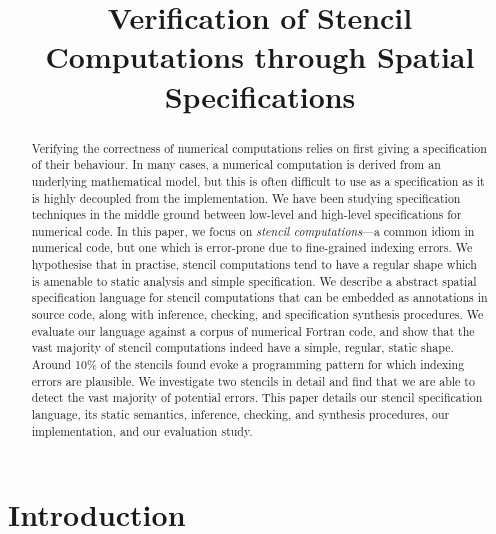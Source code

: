 \documentclass[9pt]{sigplanconf}
\title{Verification of Stencil Computations through Spatial
  Specifications}
\theoremstyle{definition}
\begin{document}
\maketitle

\begin{abstract}
  Verifying the correctness of numerical computations relies on first
  giving a specification of their behaviour. In many cases, a
  numerical computation is derived from an underlying mathematical
  model, but this is often difficult to use as a specification as it
  is highly decoupled from the implementation. We have been studying
  specification techniques in the middle ground between low-level and
  high-level specifications for numerical code. In this paper, we
  focus on \emph{stencil computations}---a common idiom in numerical
  code, but one which is error-prone due to fine-grained indexing
  errors. We hypothesise that in practise, stencil computations tend
  to have a regular shape which is amenable to static analysis and
  simple specification. We describe a abstract spatial specification
  language for stencil computations that can be embedded as
  annotations in source code, along with inference, checking, and
  specification synthesis procedures. We evaluate our
  language against a corpus of numerical Fortran code, and show that
  the vast majority of stencil computations indeed have a simple,
  regular, static shape. Around 10\% of the stencils found evoke a
  programming pattern for which indexing errors are plausible. We
  investigate two stencils in detail and find that we are able to
  detect the vast majority of potential errors. This paper details our
  stencil specification language, its static semantics, inference,
  checking, and synthesis procedures, our implementation, and
  our evaluation study.
\end{abstract}





\section{Introduction}
\end{document}
